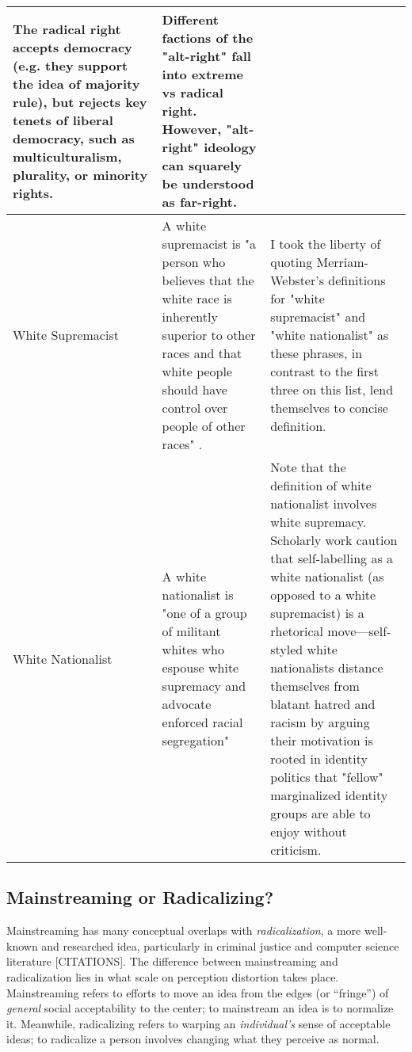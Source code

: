 \documentclass[acmlarge, screen, authorversion]{acmart}
\begin{document}
\begin{table*}
\begin{tabular}{ p{3cm}  p{7cm}  p{6cm} }
  The radical right accepts democracy (e.g. they support the idea of majority rule), but rejects key tenets of liberal democracy, such as multiculturalism, plurality, or minority rights. & Different factions of the "alt-right" fall into extreme vs radical right. However, "alt-right" ideology can squarely be understood as far-right.\\
  \hline
  White Supremacist & A white supremacist is "a person who believes that the white race is inherently superior to other races and that white people should have control over people of other races" \cite{merriam-websterDefinitionWHITESUPREMACIST}. & I took the liberty of quoting Merriam-Webster's definitions for "white supremacist" and "white nationalist" as these phrases, in contrast to the first three on this list, lend themselves to concise definition.\\
  \hline
  White Nationalist & A white nationalist is "one of a group of militant whites who espouse white supremacy and advocate enforced racial segregation" \cite{merriam-websterDefinitionWHITENATIONALIST} & Note that the definition of white nationalist involves white supremacy. Scholarly work \cite{danielsAlgorithmicRiseAltRight2018,  hartzellAltWhiteConceptualizingAltRight} caution that self-labelling as a white nationalist (as opposed to a white supremacist) is a rhetorical move---self-styled white nationalists distance themselves from blatant hatred and racism by arguing their motivation is rooted in identity politics that "fellow" marginalized identity groups are able to enjoy without criticism. \\
  \bottomrule
\end{tabular}
\end{table*}

\subsection{Mainstreaming or Radicalizing?}

Mainstreaming has many conceptual overlaps with \textit{radicalization}, a more well-known and researched idea,
particularly in criminal justice and computer science literature [CITATIONS]. The
difference between mainstreaming and radicalization lies in what scale on
perception distortion takes place. Mainstreaming refers to efforts to move an idea from the edges
(or “fringe”) of \textit{general} social acceptability to the center; to mainstream an idea is to
normalize it. Meanwhile, radicalizing refers to warping an \textit{individual's} sense of acceptable
ideas; to radicalize a person involves changing what they perceive as normal.
\end{document}
